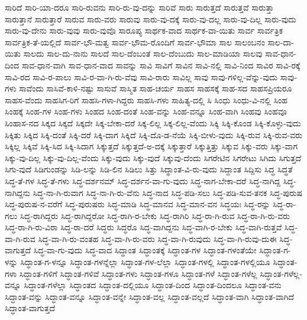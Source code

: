 {ಸಾರಿದೆ
ಸಾರಿ-ಯಾ-ದರೂ
ಸಾರಿ-ರುವನು
ಸಾರಿ-ರು-ವು-ದನ್ನು
ಸಾರಿವೆ
ಸಾರು
ಸಾರುತ್ತದೆ
ಸಾರುತ್ತವೆ
ಸಾರುತ್ತಾ
ಸಾರುತ್ತಾನೆ
ಸಾರುತ್ತಾರೆ
ಸಾರುವ
ಸಾರು-ವರು
ಸಾರುವು
ಸಾರು-ವು-ದಕ್ಕೆ
ಸಾರು-ವು-ದಲ್ಲ
ಸಾರು-ವು-ದಿಲ್ಲ
ಸಾರು-ವುದು
ಸಾರು-ವು-ದೇನು
ಸಾರು-ವುವು
ಸಾರು-ವುವೊ
ಸಾರೂಪ್ಯ
ಸಾರ್ಥಕ-ವಾದ
ಸಾರ್ಥಕ-ವಾ-ಯಿತು
ಸಾರ್ವ
ಸಾರ್ವತ್ರಿಕ
ಸಾರ್ವತ್ರಿಕ-ತೆ-ಯಲ್ಲಿದೆ
ಸಾರ್ವ-ಭೌ-ಮತ್ವ
ಸಾರ್ವ-ಭೌಮ-ರೊಂದಿಗೆ
ಸಾರ್ವ-ಭೌಮಾ
ಸಾಲ
ಸಾಲಂಬನಂ
ಸಾಲ-ದಾ-ಯಿತು
ಸಾಲದು
ಸಾಲ-ದು-ನಾನು
ಸಾಲದೆ
ಸಾಲ-ದೆಂಬಂತೆ
ಸಾಲ-ದೆಂಬುದು
ಸಾಲ-ಮಾಡಿಯಾ
ಸಾಲವು
ಸಾವ-ಧಾನ-ದಿಂದ
ಸಾವ-ಧಾನ-ವಾಗಿ
ಸಾವ-ಧಾನ-ವಾದ
ಸಾವನ್ನು
ಸಾವಿ
ಸಾವಿಗೆ
ಸಾವಿನ
ಸಾವಿ-ನಲ್ಲಿ
ಸಾವಿ-ನಿಂದ
ಸಾವಿರ
ಸಾವಿ-ರಕ್ಕೆ
ಸಾವಿ-ರದ
ಸಾವಿ-ರ-ಪಾಲು
ಸಾವಿ-ರ-ವಾ-ಗಿ-ರು-ವೆವು
ಸಾವಿ-ರಾರು
ಸಾವಿಲ್ಲ
ಸಾವು
ಸಾವು-ಗಳಿಲ್ಲ-ವೆನ್ನು-ವುದು
ಸಾವು-ಗಳು
ಸಾವೆಂದು
ಸಾಸಿವೆ-ಕಾಳಿ-ನಷ್ಟು
ಸಾಸುವೆ
ಸಾಸ್ಮಿತ
ಸಾಹ-ಚರ್ಯ
ಸಾಹಸ
ಸಾಹಸಕ್ಕೆ
ಸಾಹ-ಸದ
ಸಾಹಸಪ್ರಿಯರೂ
ಸಾಹಸ-ವೆಂದು
ಸಾಹಸಿಗ-ರಿಗೆ
ಸಾಹಸಿ-ಗಳಾ-ಗಿದ್ದರು
ಸಾಹಸಿ-ಗಳು
ಸಾಹಿತ್ಯ-ದಲ್ಲಿ
ಸಿ
ಸಿಂಧು
ಸಿಂಧು-ವಿ-ನಲ್ಲಿ
ಸಿಂಹ
ಸಿಂಹಕ್ಕೆ
ಸಿಂಹ-ಗಳ
ಸಿಂಹ-ಗಳು
ಸಿಂಹದ
ಸಿಂಹ-ದಂತೆ
ಸಿಂಹ-ವನ್ನು
ಸಿಂಹ-ವನ್ನೂ
ಸಿಂಹ-ವಾಗಿ
ಸಿಂಹವು
ಸಿಂಹವೂ
ಸಿಂಹಾಸ-ನದ
ಸಿಕ್ಕದ
ಸಿಕ್ಕದೆ
ಸಿಕ್ಕದೇ
ಸಿಕ್ಕ-ಬೇಕಾ-ದರೆ
ಸಿಕ್ಕ-ಲಿಲ್ಲ
ಸಿಕ್ಕ-ಲಿಲ್ಲ-ವೆಂದು
ಸಿಕ್ಕಿ
ಸಿಕ್ಕಿ-ಕೊಂಡ
ಸಿಕ್ಕಿ-ಕೊಳ್ಳು-ವುದು
ಸಿಕ್ಕಿತು
ಸಿಕ್ಕಿದ
ಸಿಕ್ಕಿ-ದಂತೆ
ಸಿಕ್ಕಿ-ದರೆ
ಸಿಕ್ಕಿ-ದಾಗ
ಸಿಕ್ಕಿದೆ
ಸಿಕ್ಕಿ-ದೊ-ಡ-ನೆಯೆ
ಸಿಕ್ಕಿ-ಬೀಳು-ವುದು
ಸಿಕ್ಕಿ-ರುವ
ಸಿಕ್ಕಿ-ರುವ-ವರು
ಸಿಕ್ಕಿಲ್ಲ
ಸಿಕ್ಕಿವೆ
ಸಿಕ್ಕಿ-ಸಿದ
ಸಿಕ್ಕಿ-ಸಿದಾಗ
ಸಿಕ್ಕುತ್ತದೆ
ಸಿಕ್ಕುತ್ತದೆ-ಅ-ದಕ್ಕೆ
ಸಿಕ್ಕುತ್ತಾರೆ
ಸಿಕ್ಕುತ್ತಿತ್ತು
ಸಿಕ್ಕುವ
ಸಿಕ್ಕು-ವರು
ಸಿಕ್ಕು-ವಾಗ
ಸಿಕ್ಕು-ವು-ದಿಲ್ಲ
ಸಿಕ್ಕು-ವು-ದಿಲ್ಲ-ವೆಂದು
ಸಿಕ್ಕು-ವುದು
ಸಿಕ್ಕು-ವುದೆ
ಸಿಕ್ಕುವು-ದೆಂದು
ಸಿಗರೇಟಿನ
ಸಿಗರೇಟು
ಸಿಗಿದು
ಸಿಗುತ್ತದೆ
ಸಿಗು-ವುದೆ
ಸಿಡಿಗುಂಡನ್ನು
ಸಿಡಿ-ಲನ್ನು
ಸಿಡಿ-ಲಿನ
ಸಿಡಿಲು
ಸಿತ್ತು
ಸಿದ್ಥಾಂತ-ವಿ-ರು-ವುದು
ಸಿದ್ದಾಂತ
ಸಿದ್ದಿಸು
ಸಿದ್ಧ
ಸಿದ್ಧತೆ
ಸಿದ್ಧ-ತೆ-ಗಳ
ಸಿದ್ಧ-ತೆ-ಗಳು
ಸಿದ್ಧ-ದರ್ಶನಮ್
ಸಿದ್ಧ-ದರ್ಶನ-ವಾ-ಗು-ವುದು
ಸಿದ್ಧ-ನಾಗ-ಬೇಕಾ-ದರೆ
ಸಿದ್ಧ-ನಾಗಿದ್ದ
ಸಿದ್ಧ-ನಾಗಿದ್ದನು
ಸಿದ್ಧ-ನಾ-ಗಿ-ರುವಾಗ
ಸಿದ್ಧ-ನಾ-ಗಿ-ರು-ವೆನು
ಸಿದ್ಧ-ನಾದ
ಸಿದ್ಧ-ಪಡಿ-ಸಲು
ಸಿದ್ಧ-ಪಡಿ-ಸುವ-ತನಕ
ಸಿದ್ಧ-ಪುರುಷ
ಸಿದ್ಧ-ಪುರುಷ-ನ-ವರೆಗೆ
ಸಿದ್ಧ-ಪುರುಷರು
ಸಿದ್ಧ-ಮಾಡಿ
ಸಿದ್ಧ-ಮಾನವ
ಸಿದ್ಧ-ಮಾನ-ವನ
ಸಿದ್ಧಯಃ
ಸಿದ್ಧ-ರನ್ನು
ಸಿದ್ಧ-ರಾ-ಗಲು
ಸಿದ್ಧ-ರಾಗಿದ್ದರು
ಸಿದ್ಧ-ರಾಗಿದ್ದರೋ
ಸಿದ್ಧ-ರಾಗಿ-ರ-ಬೇಕು
ಸಿದ್ಧ-ರಾಗಿರಿ
ಸಿದ್ಧ-ರಾ-ಗಿ-ರುವ
ಸಿದ್ಧ-ರಾ-ಗಿ-ರು-ವರು
ಸಿದ್ಧ-ರಾ-ಗಿ-ರು-ವಿರಾ
ಸಿದ್ಧ-ರಾ-ದರೆ
ಸಿದ್ಧರು
ಸಿದ್ಧರೊ
ಸಿದ್ಧ-ವಾಗಿದ್ದನು
ಸಿದ್ಧ-ವಾಗಿ-ರ-ಬೇಕು
ಸಿದ್ಧ-ವಾಗಿ-ರುತ್ತವೆ
ಸಿದ್ಧ-ವಾ-ಗಿ-ರುವ
ಸಿದ್ಧ-ವಾ-ಗಿ-ರು-ವಂತಹ
ಸಿದ್ಧ-ವಾ-ಗಿ-ರು-ವರು
ಸಿದ್ಧ-ವಾ-ಗಿ-ರುವುದು
ಸಿದ್ಧ-ವಾ-ಗಿ-ರುವು-ದುಈ
ಸಿದ್ಧ-ವಾಗುತ್ತದೆ
ಸಿದ್ಧ-ವಾ-ಗು-ವುದು
ಸಿದ್ಧ-ವಾದ
ಸಿದ್ಧಾಂತ
ಸಿದ್ಧಾಂತಕ್ಕೆ
ಸಿದ್ಧಾಂತ-ಗಳ
ಸಿದ್ಧಾಂತ-ಗಳಂತೆಯೇ
ಸಿದ್ಧಾಂತ-ಗ-ಳನ್ನು
ಸಿದ್ಧಾಂತ-ಗ-ಳನ್ನೂ
ಸಿದ್ಧಾಂತ-ಗಳನ್ನೆಲ್ಲಾ
ಸಿದ್ಧಾಂತ-ಗಳ-ಲೆಲ್ಲಾ
ಸಿದ್ಧಾಂತ-ಗಳಲ್ಲಿ
ಸಿದ್ಧಾಂತ-ಗಳಲ್ಲಿಯೂ
ಸಿದ್ಧಾಂತ-ಗಳಾ
ಸಿದ್ಧಾಂತ-ಗಳಿಗೆ
ಸಿದ್ಧಾಂತ-ಗಳಿವೆ
ಸಿದ್ಧಾಂತ-ಗಳು
ಸಿದ್ಧಾಂತ-ಗಳೂ
ಸಿದ್ಧಾಂತ-ಗಳೆ
ಸಿದ್ಧಾಂತ-ಗಳೆಲ್ಲ
ಸಿದ್ಧಾಂತ-ಗಳೆಲ್ಲ-ವನ್ನೂ
ಸಿದ್ಧಾಂತ-ಗಳೆಲ್ಲಾ
ಸಿದ್ಧಾಂತದ
ಸಿದ್ಧಾಂತ-ದಲ್ಲಿಯೂ
ಸಿದ್ಧಾಂತ-ದಿಂದ
ಸಿದ್ಧಾಂತ-ದಿಂದಲೂ
ಸಿದ್ಧಾಂತ-ವನು
ಸಿದ್ಧಾಂತ-ವನ್ನು
ಸಿದ್ಧಾಂತ-ವನ್ನೂ
ಸಿದ್ಧಾಂತ-ವನ್ನೇ
ಸಿದ್ಧಾಂತ-ವಲ್ಲ
ಸಿದ್ಧಾಂತ-ವಲ್ಲದೆ
ಸಿದ್ಧಾಂತ-ವಾಗಿ
ಸಿದ್ಧಾಂತ-ವಾಗಿದೆ
ಸಿದ್ಧಾಂತ-ವಾಗುತ್ತದೆ
}
